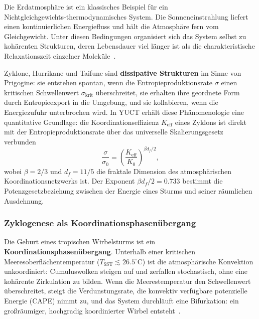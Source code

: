 \documentclass[12pt,a4paper]{article}
\newcommand{\Keff}{K_{\mathrm{eff}}}
\begin{document}
	Die Erdatmosphäre ist ein klassisches Beispiel für ein Nichtgleichgewichts‑thermodynamisches System. Die Sonneneinstrahlung liefert einen kontinuierlichen Energiefluss und hält die Atmosphäre fern vom Gleichgewicht. Unter diesen Bedingungen organisiert sich das System selbst zu kohärenten Strukturen, deren Lebensdauer viel länger ist als die charakteristische Relaxationszeit einzelner Moleküle~\cite{Prigogine1977}.
	
	Zyklone, Hurrikane und Taifune sind \textbf{dissipative Strukturen} im Sinne von Prigogine: sie entstehen spontan, wenn die Entropieproduktionsrate \(\sigma\) einen kritischen Schwellenwert \(\sigma_{\mathrm{krit}}\) überschreitet, sie erhalten ihre geordnete Form durch Entropieexport in die Umgebung, und sie kollabieren, wenn die Energiezufuhr unterbrochen wird. In YUCT erhält diese Phänomenologie eine quantitative Grundlage: die Koordinationseffizienz \(\Keff\) eines Zyklons ist direkt mit der Entropieproduktionsrate über das universelle Skalierungsgesetz verbunden
	\begin{equation}
		\frac{\sigma}{\sigma_0} = \left( \frac{\Keff}{K_0} \right)^{\beta d_f / 2},
		\label{eq:cyclone_sigma}
	\end{equation}
	wobei \(\beta = 2/3\) und \(d_f = 11/5\) die fraktale Dimension des atmosphärischen Koordinationsnetzwerks ist. Der Exponent \(\beta d_f / 2 = 0.733\) bestimmt die Potenzgesetzbeziehung zwischen der Energie eines Sturms und seiner räumlichen Ausdehnung.
	
	\subsubsection*{Zyklogenese als Koordinationsphasenübergang}
	
	Die Geburt eines tropischen Wirbelsturms ist ein \textbf{Koordinationsphasenübergang}.
	Unterhalb einer kritischen Meeresoberflächentemperatur (\(T_{\mathrm{SST}} \lesssim 26.5^{\circ}\mathrm{C}\)) ist die atmosphärische Konvektion unkoordiniert: Cumuluswolken steigen auf und zerfallen stochastisch, ohne eine kohärente Zirkulation zu bilden. Wenn die Meerestemperatur den Schwellenwert überschreitet, steigt die Verdunstungsrate, die konvektiv verfügbare potenzielle Energie (CAPE) nimmt zu, und das System durchläuft eine Bifurkation: ein großräumiger, hochgradig koordinierter Wirbel entsteht~\cite{Emanuel2003}.
	
\end{document}
